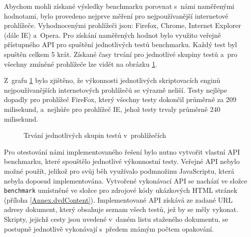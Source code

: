Abychom mohli získané výsledky benchmarku porovnat s~námi naměřenými hodnotami, bylo provedeno nejprve měření pro nejpoužívanější internetové prohlížeče. Vyhodnocenými prohlížeči jsou: Firefox, Chrome, Internet Explorer (dále IE) a~Opera. Pro získání naměřených hodnot bylo využito veřejně přístupného API pro spuštění jednotlivých testů benchmarku. Každý test byl spuštěn celkem 5 krát. Získané časy trvání pro jednotlivé skupiny testů a~pro všechny zmíněné prohlížeče lze vidět na obrázku \ref{Figure.BrowsersComparison}.

Z~grafu \ref{Figure.BrowsersComparison} bylo zjištěno, že výkonnosti
jednotlivých skriptovacích enginů nejpoužívanějších internetových prohlížečů se výrazně neliší. Testy nejlépe dopadly pro prohlížeč FireFox, který všechny testy dokončil průměrně za 209 milisekund, a~nejhůře pro prohlížeč IE, jehož testy trvaly průměrně $240$ milisekund.

\begin{figure}[H]
  \begin{center}
    \caption{Trvání jednotlivých skupin testů v~prohlížečích}
    \label{Figure.BrowsersComparison}
  \end{center}
\end{figure}

\vspace{-1em}

Pro otestování námi implementovaného řešení bylo nutno vytvořit vlastní API benchmarku, které spouštělo jednotlivé výkonnostní testy. Veřejné API nebylo možné použít, jelikož pro svůj běh využívalo podmnožinu JavaScriptu, která nebyla doposud implementována. Vytvořené vykonávací API se nachází ve složce \texttt{benchmark} umístněné ve složce pro zdrojové kódy ukázkových HTML stránek (příloha \ref{Annex.dvdContent}). Implementované API získává ze zadané URL adresy dokument, který obsahuje seznam všech testů, jež by se měly vykonat. Skripty, jejichž cesty jsou uvedené v~daném listu staženého dokumentu, se postupně jednotlivě vykonávají s~předem známým počtem opakování.

